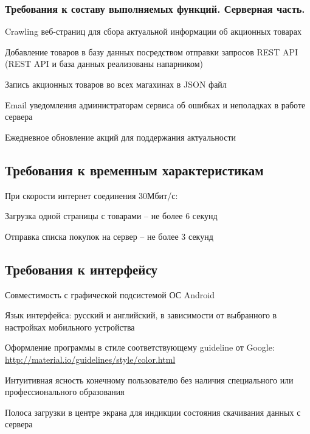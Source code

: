 \subsubsection{Требования к составу выполняемых функций. Серверная часть.}
\begin{my_enumerate}
\item Crawling веб-страниц для сбора актуальной информации об акционных товарах
\item Добавление товаров в базу данных посредством отправки запросов REST API (REST API и база данных реализованы напарником)
\item Запись акционных товаров во всех магахинах в JSON файл
\item Email уведомления администраторам сервиса об ошибках и неполадках в работе сервера
\item Ежедневное обновление акций для поддержания актуальности
\end{my_enumerate}

\subsection{Требования к временным характеристикам}
При скорости интернет соединения 30Мбит/с:
\begin{my_enumerate}
\item Загрузка одной страницы с товарами -- не более 6 секунд
\item Отправка списка покупок на сервер -- не более 3 секунд
\end{my_enumerate}

\subsection{Требования к интерфейсу}
\begin{my_enumerate}
\item Совместимость с графической подсистемой ОС Android {\textregistered}
\item Язык интерфейса: русский и английский, в зависимости от выбранного в настройках мобильного устройства
\item Оформление программы в стиле соответствующему guideline от Google: \url{http://material.io/guidelines/style/color.html}
\item Интуитивная ясность конечному пользователю без наличия специального или профессионального образования
\item Полоса загрузки в центре экрана для индикции состояния скачивания данных с сервера
\end{my_enumerate}

